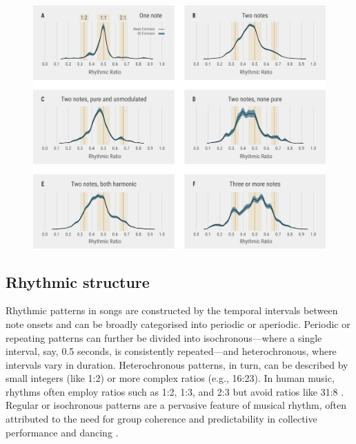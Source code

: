 \begin{figure}[ht!]
    \centering
    \includegraphics[width=\linewidth]{figures/chapter_5/rhythmic-songtypes.pdf}
    \label{c5_fig:rhythmic-songtypes}
\end{figure}


\subsection{Rhythmic structure}

Rhythmic patterns in songs are constructed by the temporal intervals between note onsets and can be broadly categorised into periodic or aperiodic. Periodic or repeating patterns can further be divided into isochronous---where a single interval, say, 0.5 seconds, is consistently repeated---and heterochronous, where intervals vary in duration. Heterochronous patterns, in turn, can be described by small integers (like 1:2) or more complex ratios (e.g., 16:23). In human music, rhythms often employ ratios such as 1:2, 1:3, and 2:3 but avoid ratios like 31:8 \autocite{ravignani2014}. Regular or isochronous patterns are a pervasive feature of musical rhythm, often attributed to the need for group coherence and predictability in collective performance and dancing \autocite{kotz2018}. 

